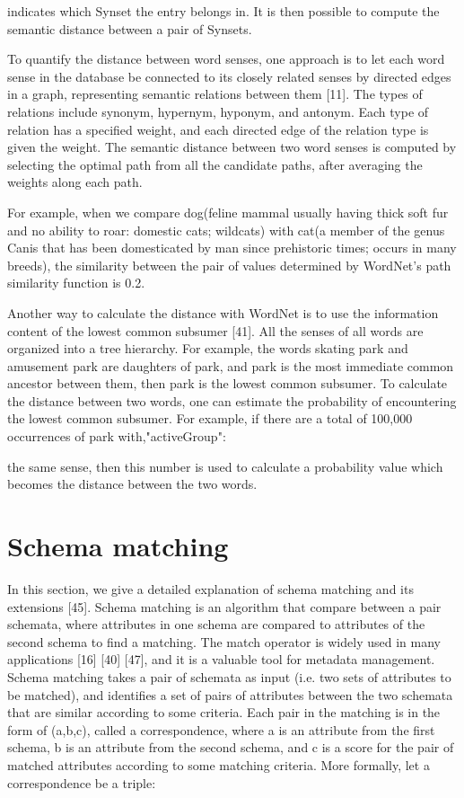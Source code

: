 indicates which Synset the entry belongs in. It is then possible to compute the semantic distance between a pair of Synsets.

To quantify the distance between word senses, one approach is to let each word sense in the database be connected to its closely related senses by directed edges in a graph, representing semantic relations between them \cite{cruz2005role}[11]. The types of relations include synonym, hypernym, hyponym, and antonym. Each type of relation has a specified weight, and each directed edge of the relation type is given the weight. The semantic distance between two word senses is computed by selecting the optimal path from all the candidate paths, after averaging the weights along each path.

For example, when we compare dog(feline mammal usually having thick soft fur and no ability to roar: domestic cats; wildcats) with cat(a member of the genus Canis that has been domesticated by man since prehistoric times; occurs in many breeds), the similarity between the pair of values determined by WordNet's path similarity function is 0.2.

Another way to calculate the distance with WordNet is to use the information content of the lowest common subsumer \cite{Resnik1970Using}[41]. All the senses of all words are organized into a tree hierarchy. For example, the words skating park and amusement park are daughters of park, and park is the most immediate common ancestor between them, then park is the lowest common subsumer. To calculate the distance between two words, one can estimate the probability of encountering the lowest common subsumer. For example, if there are a total of 100,000 occurrences of park with,"activeGroup":

the same sense, then this number is used to calculate a probability value which becomes the distance between the two words.

\section{Schema matching}
\label{sec:SchemaMatching}

In this section, we give a detailed explanation of schema matching and its extensions \cite{Sorrentino2011NORMS}[45]. Schema matching is an algorithm that compare between a pair schemata, where attributes in one schema are compared to attributes of the second schema to find a matching. The match operator is widely used in many applications \cite{Dong2012Proceedings}[16] \cite{Rahm2001Survey}[40] \cite{10.1145/3183713.3183729}[47], and it is a valuable tool for metadata management. Schema matching takes a pair of schemata as input (i.e. two sets of attributes to be matched), and identifies a set of pairs of attributes between the two schemata that are similar according to some criteria. Each pair in the matching is in the form of (a,b,c), called a correspondence, where a is an attribute from the first schema, b is an attribute from the second schema, and c is a score for the pair of matched attributes according to some matching criteria.
More formally, let a correspondence be a triple:


